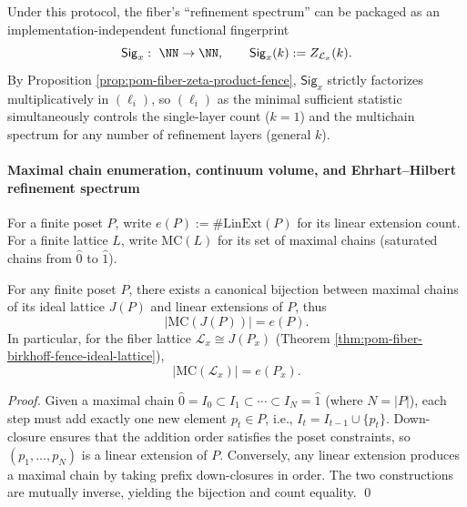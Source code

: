 \begin{remark}\label{rem:pom-fence-sig-function}
Under this protocol, the fiber's ``refinement spectrum'' can be packaged as an implementation-independent functional fingerprint
\[
\mathsf{Sig}_x:\ \NN\to\NN,\qquad
\mathsf{Sig}_x(k):=Z_{\mathcal L_x}(k).
\]
By Proposition \ref{prop:pom-fiber-zeta-product-fence}, \(\mathsf{Sig}_x\) strictly factorizes multiplicatively in \((\ell_i)\),
so \((\ell_i)\) as the minimal sufficient statistic simultaneously controls the single-layer count (\(k=1\)) and the multichain spectrum for any number of refinement layers (general \(k\)).
\end{remark}

\paragraph{Maximal chain enumeration, continuum volume, and Ehrhart--Hilbert refinement spectrum}

\begin{definition}\label{def:pom-fence-linext-maxchain}
For a finite poset \(P\), write \(e(P):=\#\mathrm{LinExt}(P)\) for its linear extension count.
For a finite lattice \(L\), write \(\mathrm{MC}(L)\) for its set of maximal chains (saturated chains from \(\hat0\) to \(\hat1\)).
\end{definition}

\begin{theorem}\label{thm:pom-maxchains-equals-linext}
For any finite poset \(P\), there exists a canonical bijection between maximal chains of its ideal lattice \(J(P)\) and linear extensions of \(P\),
thus
\[
|\mathrm{MC}(J(P))|=e(P).
\]
In particular, for the fiber lattice \(\mathcal L_x\cong J(P_x)\) (Theorem \ref{thm:pom-fiber-birkhoff-fence-ideal-lattice}),
\[
|\mathrm{MC}(\mathcal L_x)|=e(P_x).
\]
\end{theorem}
\begin{proof}
Given a maximal chain \(\hat0=I_0\subset I_1\subset\cdots\subset I_N=\hat1\) (where \(N=|P|\)),
each step must add exactly one new element \(p_t\in P\), i.e., \(I_t=I_{t-1}\cup\{p_t\}\).
Down-closure ensures that the addition order satisfies the poset constraints, so \((p_1,\dots,p_N)\) is a linear extension of \(P\).
Conversely, any linear extension produces a maximal chain by taking prefix down-closures in order.
The two constructions are mutually inverse, yielding the bijection and count equality. \qed
\end{proof}

